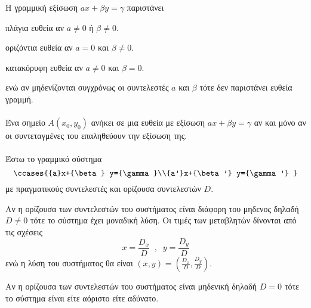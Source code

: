 \documentclass[twoside,nofonts,internet,shmeiwseis]{thewria}
\begin{document}
\thewrhmata
{}
Η γραμμική εξίσωση $ ax+\beta y=\gamma $ παριστάνει
\begin{rlist}
\item πλάγια ευθεία αν $ a\neq0 $ ή $ \beta\neq0 $.
\item οριζόντια ευθεία αν $ a=0 $ και $ \beta\neq0 $.
\item κατακόρυφη ευθεία αν $ a\neq0 $ και $ \beta=0 $.
\end{rlist}
ενώ αν μηδενίζονται συγχρόνως οι συντελεστές $ a $ και $ \beta $ τότε δεν παριστάνει ευθεία γραμμή.\\\\
Ένα σημείο $ A(x_0,y_0) $ ανήκει σε μια ευθεία με εξίσωση $ ax+\beta y=\gamma $ αν και μόνο αν οι συντεταγμένες του επαληθεύουν την εξίσωση της.\\\\
Έστω το γραμμικό σύστημα 
\[ \ccases{{a}x+{\beta} y={\gamma}\\{a'}x+{\beta'} y={\gamma'} } \]
με πραγματικούς συντελεστές και ορίζουσα συντελεστών $ D $.
\begin{rlist}
\item Αν η ορίζουσα των συντελεστών του συστήματος είναι διάφορη του μηδενος δηλαδή $ D\neq0 $ τότε το σύστημα έχει μοναδική λύση. Οι τιμές των μεταβλητών δίνονται από τις σχέσεις
\[ x=\frac{D_x}{D}\;\;,\;\;y=\frac{D_y}{D} \]
ενώ η λύση του συστήματος θα είναι $ (x,y)=\left(\frac{D_x}{D},\frac{D_y}{D} \right)  $.
\item Αν η ορίζουσα των συντελεστών του συστήματος είναι μηδενική δηλαδή $ D=0 $ τότε το σύστημα είναι είτε αόριστο είτε αδύνατο.
\end{rlist}
\newpage
\noindent
\end{document}
